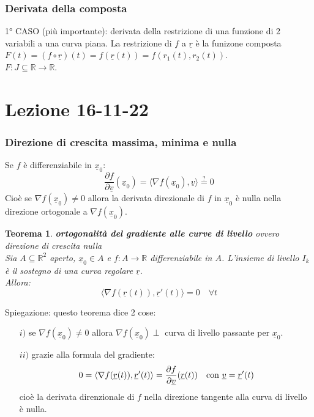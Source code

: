 \documentclass{scrreprt}
\newtheorem{teorema}{Teorema}
\newenvironment{thm}{\begin{mdframed}[backgroundcolor=Ivory2]\begin{teorema}}{\end{teorema}\end{mdframed}}
\begin{document}
\subsubsection{Derivata della composta}
1° CASO (più importante): derivata della restrizione di una funzione di 2 variabili a una curva piana. La restrizione di $f$ a $\underline{r}$ è la funizone composta $F(t) = (f \circ \underline{r})(t) = f(\underline{r}(t)) = f(r_1(t), r_2(t))$.\\
$F: J \subseteq \mathbb{R} \to \mathbb{R}$.\\

\section*{Lezione 16-11-22}
\subsubsection{Direzione di crescita massima, minima e nulla}
Se $f$ è differenziabile in $\underline{x}_0$:
\begin{equation}
	\frac{\partial f}{\partial \underline{v}} (\underline{x}_0) = \langle \nabla f(\underline{x}_0), \underline{v} \rangle \stackrel{?}{=} 0 %
\end{equation}
Cioè se $\nabla f(\underline{x}_0) \neq 0$ allora la derivata direzionale di $f$ in $\underline{x}_0$ è nulla nella direzione ortogonale a $\nabla f(\underline{x}_0)$.\\
\begin{thm} \textbf{ortogonalità del gradiente alle curve di livello} ovvero direzione di crescita nulla\\
	Sia $A \subseteq \mathbb{R}^2$ aperto, $\underline{x}_0 \in A$ e $f: A \to \mathbb{R}$ differenziabile in $A$. L'insieme di livello $I_k$ è il sostegno di una curva regolare $\underline{r}$.\\
	Allora:
	\begin{equation}
		\langle \nabla f(\underline{r}(t)), \underline{r}'(t) \rangle = 0 \quad \forall t
	\end{equation}
\end{thm}
Spiegazione: questo teorema dice 2 cose:
\begin{enumerate}
	\item[$i)$] se $\nabla f(\underline{x}_0) \neq 0$ allora $\nabla f(\underline{x}_0)\perp$ curva di livello passante per $\underline{x}_0$.
	\item[$ii)$] grazie alla formula del gradiente:
		\begin{equation}
			0 = \langle \nabla f(\underline{r}(t)), \underline{r}'(t) \rangle = \frac{\partial f}{\partial \underline{v}} (\underline{r}(t)) \quad  \textnormal{con } \underline{v} = \underline{r}'(t)
		\end{equation} 
		cioè la derivata direnzionale di $f$ nella direzione tangente alla curva di livello è nulla.
\end{enumerate}
\end{document}

